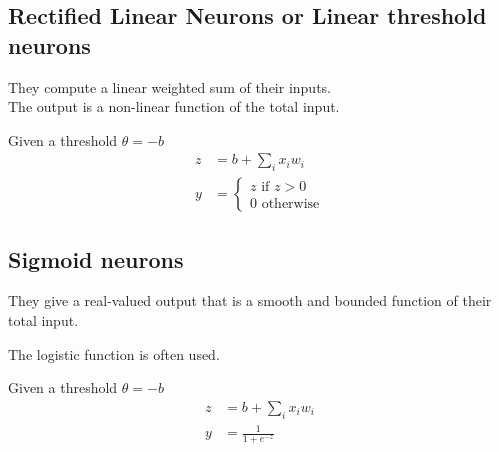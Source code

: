 \documentclass{article}
\begin{document}
\subsection{Rectified Linear Neurons or Linear threshold neurons}

They compute a linear weighted sum of their inputs. \\
The output is a non-linear function of the total input.

Given a threshold \(\theta=-b\)
\begin{align*}    
    z&=b+\sum_{i} x_i w_i \\
    y&=\begin{cases}
        z \text{ if } z > 0 \\
        0 \text{ otherwise}
    \end{cases}
\end{align*}

\begin{center}
\end{center}

\subsection{Sigmoid neurons}

They give a real-valued output that is a smooth and bounded function of their total input.

The logistic function is often used.

Given a threshold \(\theta=-b\)
\begin{align*}    
    z&=b+\sum_{i} x_i w_i \\
    y&=\frac{1}{1+e^{-z}}
\end{align*}

\begin{center}
\end{center}
\end{document}
